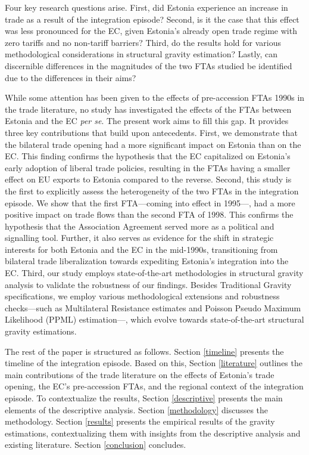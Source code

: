 \documentclass[a4paper,10pt]{article}
\begin{document}
Four key research questions arise. First, did Estonia experience an increase in trade as a result of the  integration episode? Second, is it the case that this effect was less pronounced for the EC, given Estonia's already open trade regime with zero tariffs and no non-tariff barriers? Third, do the results hold for various methodological considerations in structural gravity estimation? Lastly, can discernible differences in the magnitudes of the two FTAs studied be identified due to the differences in their aims?

While some attention has been given to the effects of pre-accession FTAs 1990s in the trade literature, no study has investigated the effects of the FTAs between Estonia and the EC \textit{per se}. The present work aims to fill this gap. It provides three key contributions that build upon antecedents. First, we demonstrate that the bilateral trade opening had a more significant impact on Estonia than on the EC. This finding confirms the hypothesis that the EC capitalized on Estonia's early adoption of liberal trade policies, resulting in the FTAs having a smaller effect on EU exports to Estonia compared to the reverse. Second, this study is the first to explicitly assess the heterogeneity of the two FTAs in the integration episode. We show that the first FTA---coming into effect in 1995---, had a more positive impact on trade flows than the second FTA of 1998. This confirms the hypothesis that the Association Agreement served more as a political and signalling tool. Further, it also serves as evidence for the shift in strategic interests for both Estonia and the EC in the mid-1990s, transitioning from bilateral trade liberalization towards expediting Estonia's integration into the EC. Third, our study employs state-of-the-art methodologies in structural gravity analysis to validate the robustness of our findings. Besides  Traditional Gravity specifications, we employ various methodological extensions and robustness checks---such as  Multilateral Resistance estimates and Poisson Pseudo Maximum Likelihood (PPML) estimation---, which evolve towards state-of-the-art structural gravity estimations.

The rest of the paper is structured as follows. Section \ref{timeline} presents the timeline of the integration episode. Based on this, Section \ref{literature} outlines the main contributions of the trade literature on the effects of Estonia's trade opening, the EC's pre-accession FTAs, and the regional context of the integration episode. To contextualize the results, Section \ref{descriptive} presents the main elements of the descriptive analysis. Section \ref{methodology} discusses the methodology. Section \ref{results} presents the empirical results of the gravity estimations, contextualizing them with insights from the descriptive analysis and existing literature. Section \ref{conclusion} concludes.
\end{document}
